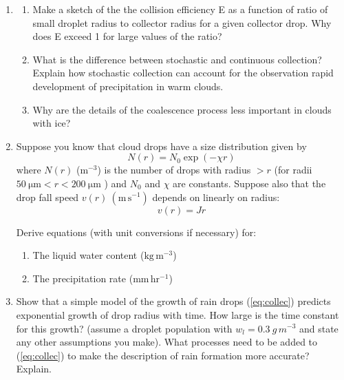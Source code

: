 \documentclass[12pt]{article}
\begin{document}
\begin{enumerate}

\item[C1] 

  \begin{enumerate}
  \item Make a sketch of the the collision efficiency E as a function
    of ratio of small droplet radius to collector radius for a given
    collector drop.  Why does E exceed 1 for large values of the
    ratio?
  \item What is the difference between stochastic and continuous
    collection? Explain how stochastic collection can account for the
    observation rapid development of precipitation in warm clouds.
  \item Why are the details of the coalescence process less important
    in clouds with ice?
  \end{enumerate}


\item[C2] Suppose you know that cloud drops have a size distribution given
  by 
  \begin{equation}
    \label{marshall}
    N(r)=N_0 \exp (- \chi r)
  \end{equation}
\noindent
where $N(r)$ ($\mathrm m^{-3}$) is the number of drops with radius $>
r$ (for radii $50\ \mathrm{\mu m} < r < 200\ \mathrm{\mu m}$ ) and $N_0$
and $\chi$ are constants.  Suppose also that the drop fall speed
$v(r)\ (\mathrm{m\,s^{-1}})$ 
depends on linearly on radius:
\begin{equation}
  \label{fallspeed}
  v(r)=Jr
\end{equation}

Derive equations (with unit conversions if necessary) for:

\begin{enumerate}
\item The liquid water content ($\mathrm{kg\,m^{-3}}$)
\item The precipitation rate ($\mathrm{mm\,hr^{-1}}$)
\end{enumerate}


\item[C3] Show that a simple model of the growth of rain drops
    (\ref{eq:collec}) predicts exponential growth of drop radius with
    time.  How large is the time constant for this growth? (assume a
    droplet population with $w_l = 0.3\ g\,m^{-3}$ and state any other
    assumptions you make).  What processes need to be added to
    (\ref{eq:collec}) to make the description of rain formation more
    accurate? Explain.




\end{enumerate}
\end{document}
